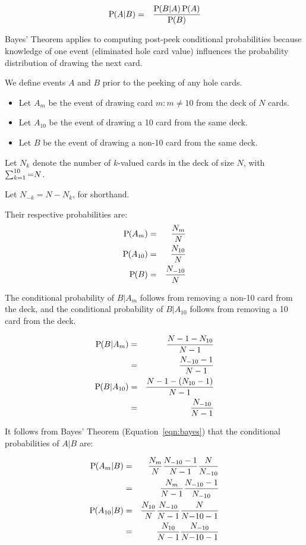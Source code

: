 \begin{eqnarray}
\textrm{P}\hspace{-.5ex}\left(A|B\right) &=& \frac{\textrm{P}\hspace{-.5ex}\left(B|A\right)\textrm{P}\hspace{-.5ex}\left(A\right)}{\textrm{P}\hspace{-.5ex}\left(B\right)} \label{eqn:bayes}
\end{eqnarray}

Bayes' Theorem applies to computing post-peek conditional probabilities
because knowledge of one event (eliminated hole card value)
influences the probability distribution of drawing the next card.

We define events $A$ and $B$ prior to the peeking of any hole cards.
\begin{itemize}
\item Let $A_m$ be the event of drawing card $m:m\neq{}10$ 
from the deck of $N$ cards.
\item Let $A_{10}$ be the event of drawing a 10 card from the same deck.
\item Let $B$ be the event of drawing a non-10 card from the same deck.
\end{itemize}

\noindent
Let $N_k$ denote the number of $k$-valued cards in the deck of size $N$,
with $\sum_{k=1}^{10}{=}N$.

\noindent
Let $N_{-k}=N-N_k$, for shorthand.

\noindent
Their respective probabilities are:
\begin{eqnarray}
\textrm{P}\hspace{-.5ex}\left(A_m\right) &=& \frac{N_m}{N}\\
\textrm{P}\hspace{-.5ex}\left(A_{10}\right) &=& \frac{N_{10}}{N}\\
\textrm{P}\hspace{-.5ex}\left(B\right) &=& \frac{N_{-10}}{N}
\end{eqnarray}

\noindent
The conditional probability of $B|A_m$ follows from removing a non-10 card
from the deck, 
and the conditional probability of $B|A_{10}$ follows from removing a 10 card
from the deck.

\begin{eqnarray}
\textrm{P}\hspace{-.5ex}\left(B|A_m\right) &=& \frac{N-1-N_{10}}{N-1} \nonumber \\
&=& \frac{N_{-10}-1}{N-1}\\
\textrm{P}\hspace{-.5ex}\left(B|A_{10}\right) &=& \frac{N-1-\left(N_{10}-1\right)}{N-1} \nonumber \\
&=& \frac{N_{-10}}{N-1}
\end{eqnarray}

\noindent
It follows from Bayes' Theorem (Equation~\ref{eqn:bayes}) that
the conditional probabilities of $A|B$ are:

\begin{eqnarray}
\textrm{P}\hspace{-.5ex}\left(A_m|B\right) &=& \frac{N_m}{N}\frac{N_{-10}-1}{N-1}\frac{N}{N_{-10}} \nonumber \\
&=& \frac{N_m}{N-1}\frac{N_{-10}-1}{N_{-10}} \label{eqn:Am_B} \\
\textrm{P}\hspace{-.5ex}\left(A_{10}|B\right) &=& \frac{N_{10}}{N}\frac{N_{-10}}{N-1}\frac{N}{N{-10}-1} \nonumber \\
&=& \frac{N_{10}}{N-1}\frac{N_{-10}}{N{-10}-1} \label{eqn:A10_B}
\end{eqnarray}

